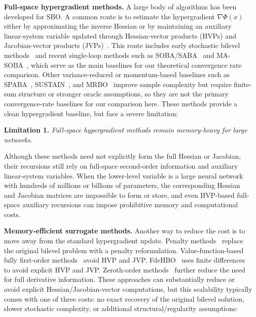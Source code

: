 \documentclass{pkumelon}
\newenvironment{limbox}{\begin{limitationbox}}{\end{limitationbox}}
\theoremstyle{plain}
\begin{document}
\textbf{Full-space hypergradient methods. }A large body of algorithms has been developed for SBO. A common route is to estimate the hypergradient $\nabla \Phi(x)$ either by approximating the inverse Hessian or by maintaining an auxiliary linear-system variable updated through Hessian-vector products (HVPs) and Jacobian-vector products (JVPs)~\citep{ghadimi2018approximation,khanduri2021near}. This route includes early stochastic bilevel methods~\citep{ghadimi2018approximation,hong2023two,ji2021bilevel} and recent single-loop methods such as SOBA/SABA~\citep{dagreou2022framework} and MA-SOBA~\citep{chen2024optimal}, which serve as the main baselines for our theoretical convergence rate comparison. Other variance-reduced or momentum-based baselines such as SPABA~\citep{chu2024spaba}, SUSTAIN~\citep{khanduri2021near}, and MRBO~\citep{yang2021provably} improve sample complexity but require finite-sum structure or stronger oracle assumptions, so they are not the primary convergence-rate baselines for our comparison here. These methods provide a clean hypergradient baseline, but face a severe limitation:

\begin{limbox}
\textbf{Limitation 1. }\emph{Full-space hypergradient methods remain memory-heavy for large networks.}
\end{limbox}

Although these methods need not explicitly form the full Hessian or Jacobian, their recursions still rely on full-space second-order information and auxiliary linear-system variables. When the lower-level variable is a large neural network with hundreds of millions or billions of parameters, the corresponding Hessian and Jacobian matrices are impossible to form or store, and even HVP-based full-space auxiliary recursions can impose prohibitive memory and computational costs.

\textbf{Memory-efficient surrogate methods. } Another way to reduce the cost is to move away from the standard hypergradient update. Penalty methods~\citep{mehra2021penalty,kwon2023penalty} replace the original bilevel problem with a penalty reformulation. Value-function-based fully first-order methods~\citep{kwon2023fully} avoid HVP and JVP. FdeHBO~\citep{yang2023achieving} uses finite differences to avoid explicit HVP and JVP. Zeroth-order methods~\citep{shirkavand2025bilevel} further reduce the need for full derivative information. These approaches can substantially reduce or avoid explicit Hessian/Jacobian-vector computations, but this scalability typically comes with one of three costs: no exact recovery of the original bilevel solution, slower stochastic complexity, or additional structural/regularity assumptions:
\end{document}
